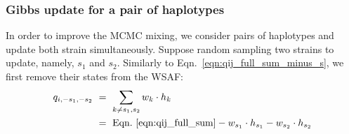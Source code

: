 \documentclass{bioinfo}
\begin{document}
\subsubsection{Gibbs update for a pair of haplotypes}\label{sec:deconvolute}
In order to improve the MCMC mixing, we consider pairs of haplotypes and update both strain simultaneously. Suppose random sampling two strains to update, namely, $s_1$ and $s_2$. Similarly to Eqn.~\eqref{eqn:qij_full_sum_minus_s}, we first remove their states from the WSAF:
\begin{equation}
\begin{split}
q_{i,-s_1, -s_2} & ~ = ~ \sum_{k\neq s_1,s_2} w_k \cdot h_k \\
                 & ~ = ~ \textrm{Eqn.~\eqref{eqn:qij_full_sum}} - w_{s_1} \cdot h_{s_1} - w_{s_2} \cdot h_{s_2} \label{eqn:qij_full_sum_minus_s1_s2}
\end{split}
\end{equation}
\end{document}
